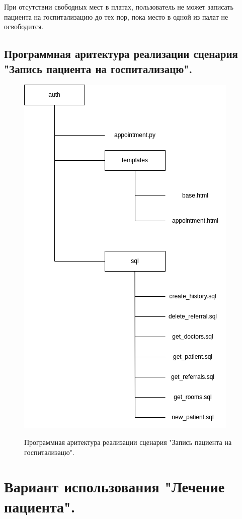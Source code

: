 \documentclass[12pt, a4paper]{article}
\begin{document}
   При отсутствии свободных мест в платах, пользователь не может записать пациента на госпитализацию до тех пор, пока место в одной из палат не освободится.
   
   \newpage
   \subsection{Программная аритектура реализации сценария "Запись пациента на госпитализацю".}
   \begin{figure}[ht!]
   	\centering    %
   	\includegraphics[height=0.5\textheight]{pictures/archReferral.png}
   	\label{fig:pic10} %
   	\caption{Программная аритектура реализации сценария "Запись пациента на госпитализацю".}
   \end{figure}

   \section{Вариант использования "Лечение пациента".}
\end{document}
